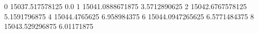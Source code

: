0 15037.517578125 0.0
1 15041.0888671875 3.5712890625
2 15042.6767578125 5.1591796875
4 15044.4765625 6.958984375
6 15044.0947265625 6.5771484375
8 15043.529296875 6.01171875
